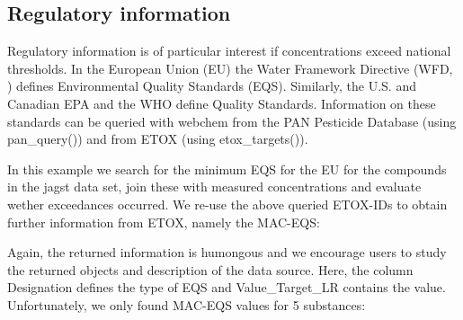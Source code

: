 \subsection[Regulatory information]{Regulatory information}
Regulatory information is of particular interest if concentrations exceed national thresholds.
In the European Union (EU) the Water Framework Directive (WFD, \citet{european_union_directive_2000}) defines Environmental Quality Standards (EQS).
Similarly, the U.S. and Canadian EPA and the WHO define Quality Standards.
Information on these standards can be queried with webchem from the PAN Pesticide Database (using pan\_query()) and from ETOX (using etox\_targets()).

In this example we search for the minimum EQS for the EU for the compounds in the jagst data set, join these with measured concentrations and evaluate wether exceedances occurred.
We re-use the above queried ETOX-IDs to obtain further information from ETOX, namely the MAC-EQS:


\begin{knitrout}
\color{fgcolor}\begin{kframe}
\begin{alltt}
 \hlkwb{<-} \hlopt{$}
\hlopt{$} \hlkwb{<-}  \hlstd{(}\hlstd{)\{}
           \hlstd{(} \hlopt{==}  \hlopt{&&} 
            \hlstd{(}\hlstd{)}
          \hlstd{\}}  \hlstd{\{}
             \hlkwb{<-} \hlopt{$}
          \hlstd{(res[res}\hlopt{$} \hlopt{==}  \hlopt{&}
                      \hlopt{$} \hlopt{==} \hlstd{,} \hlstd{])}
  \hlstd{\}}
\hlstd{\})}
\end{alltt}
\end{kframe}
\end{knitrout}

Again, the returned information is humongous and we encourage users to study the returned objects and description of the data source.
Here, the column Designation defines the type of EQS and Value\_Target\_LR contains the value.
Unfortunately, we only found MAC-EQS values for 5 substances:

